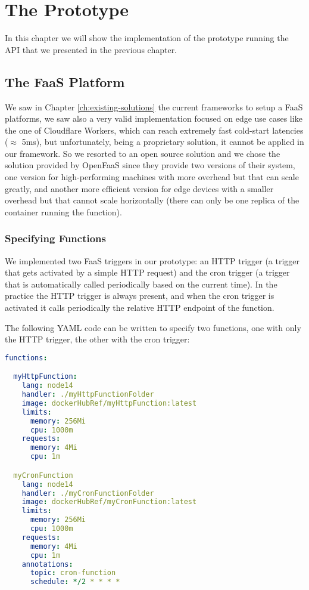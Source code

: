 \chapter{The Prototype}
\label{ch:prototype}

In this chapter we will show the implementation of the prototype running the API that we presented in the previous chapter.

\section{The FaaS Platform}
We saw in Chapter \ref{ch:existing-solutions} the current frameworks to setup a FaaS platforms, we saw also a very valid implementation focused on edge use cases like the one of Cloudflare Workers, which can reach extremely fast cold-start latencies ($\approx$ 5ms), but unfortunately, being a proprietary solution, it cannot be applied in our framework.
So we resorted to an open source solution and we chose the solution provided by OpenFaaS since they provide two versions of their system, one version for high-performing machines with more overhead but that can scale greatly, and another more efficient version for edge devices with a smaller overhead but that cannot scale horizontally (there can only be one replica of the container running the function).


\subsection{Specifying Functions}
\label{subsec:specifying-functions}

We implemented two FaaS triggers in our prototype: an HTTP trigger (a trigger that gets activated by a simple HTTP request) and the cron trigger (a trigger that is automatically called periodically based on the current time). In the practice the HTTP trigger is always present, and when the cron trigger is activated it calls periodically the relative HTTP endpoint of the function.

The following YAML code can be written to specify two functions, one with only the HTTP trigger, the other with the cron trigger:

\begin{lstlisting}[language=yaml,firstnumber=1]
functions:

  myHttpFunction:
    lang: node14
    handler: ./myHttpFunctionFolder
    image: dockerHubRef/myHttpFunction:latest
    limits:
      memory: 256Mi
      cpu: 1000m
    requests:
      memory: 4Mi
      cpu: 1m

  myCronFunction
    lang: node14
    handler: ./myCronFunctionFolder
    image: dockerHubRef/myCronFunction:latest
    limits:
      memory: 256Mi
      cpu: 1000m
    requests:
      memory: 4Mi
      cpu: 1m
    annotations:
      topic: cron-function
      schedule: */2 * * * *
\end{lstlisting}

